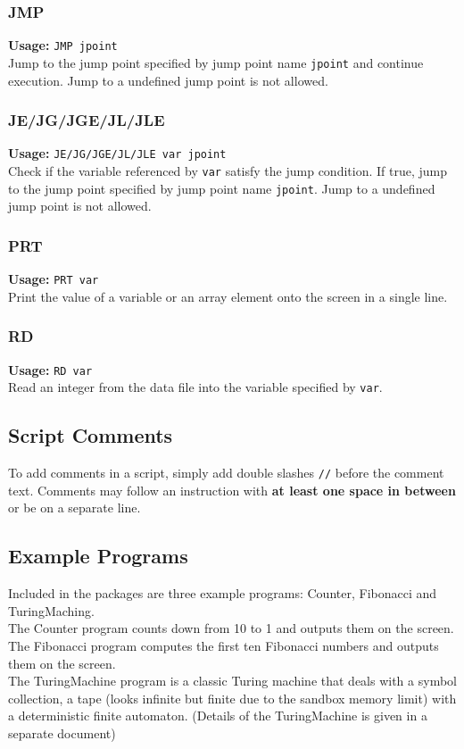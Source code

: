 \documentclass[11pt]{article}
\begin{document}
\subsubsection{JMP}
{\bf Usage:} {\tt JMP jpoint}\\
Jump to the jump point specified by jump point name {\tt jpoint} and continue execution. Jump to a undefined jump point is not allowed.
\subsubsection{JE/JG/JGE/JL/JLE}
{\bf Usage:} {\tt JE/JG/JGE/JL/JLE var jpoint}\\
Check if the variable referenced by {\tt var} satisfy the jump condition. If true, jump to the jump point specified by jump point name {\tt jpoint}. Jump to a undefined jump point is not allowed.
\subsubsection{PRT}
{\bf Usage:} {\tt PRT var}\\
Print the value of a variable or an array element onto the screen in a single line.
\subsubsection{RD}
{\bf Usage:} {\tt RD var}\\
Read an integer from the data file into the variable specified by {\tt var}.

\subsection{Script Comments}
To add comments in a script, simply add double slashes {\tt //} before the comment text. Comments may follow an instruction with {\bf at least one space in between} or be on a separate line. 


\subsection{Example Programs}
Included in the packages are three example programs: Counter, Fibonacci and TuringMaching.\\
The Counter program counts down from 10 to 1 and outputs them on the screen.\\
The Fibonacci program computes the first ten Fibonacci numbers and outputs them on the screen.\\
The TuringMachine program is a classic Turing machine that deals with a symbol collection, a tape (looks infinite but finite due to the sandbox memory limit) with a deterministic finite automaton. (Details of the TuringMachine is given in a separate document)
\end{document}
